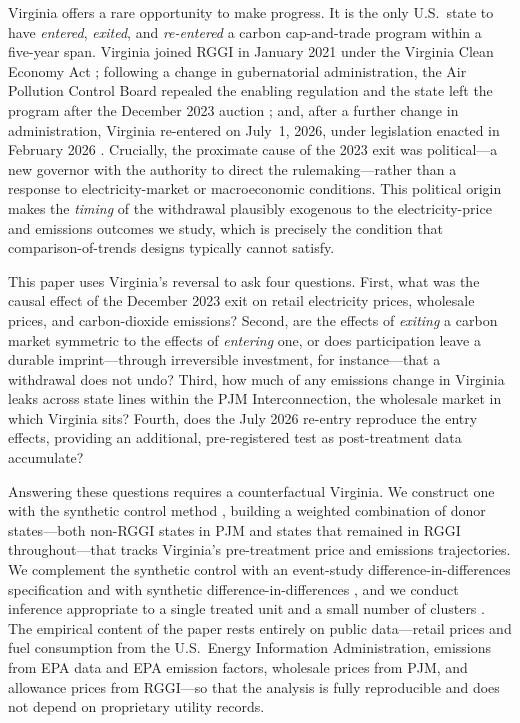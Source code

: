 \documentclass[12pt]{article}
\begin{document}
Virginia offers a rare opportunity to make progress. It is the only U.S.\ state to have
\emph{entered}, \emph{exited}, and \emph{re-entered} a carbon cap-and-trade
program within a five-year span. Virginia joined RGGI in January 2021 under the Virginia
Clean Economy Act \citep{VCEA2020}; following a change in gubernatorial administration, the
Air Pollution Control Board repealed the enabling regulation and the state left the program
after the December 2023 auction \citep{VAAPCB2023_repeal}; and, after a further change in
administration, Virginia re-entered on July~1, 2026, under legislation enacted in February
2026 \citep{VAHB29_2026,VADEQ2026_reinstate}. Crucially, the proximate
cause of the 2023 exit was political---a new governor with the authority to direct the
rulemaking---rather than a response to electricity-market or macroeconomic conditions. This
political origin makes the \emph{timing} of the withdrawal plausibly exogenous to the
electricity-price and emissions outcomes we study, which is precisely the condition that
comparison-of-trends designs typically cannot satisfy.

This paper uses Virginia's reversal to ask four questions. First, what was the causal effect
of the December 2023 exit on retail electricity prices, wholesale prices, and carbon-dioxide
emissions? Second, are the effects of \emph{exiting} a carbon market symmetric to the effects
of \emph{entering} one, or does participation leave a durable imprint---through irreversible
investment, for instance---that a withdrawal does not undo? Third, how much of any emissions
change in Virginia leaks across state lines within the PJM Interconnection, the wholesale
market in which Virginia sits? Fourth, does the July 2026 re-entry reproduce the entry
effects, providing an additional, pre-registered test as post-treatment data accumulate?

Answering these questions requires a counterfactual Virginia. We construct one with the
synthetic control method \citep{Abadie2010_synth,Abadie2015_comparative,Abadie2021_using_synth},
building a weighted combination of donor states---both non-RGGI states in PJM and states that
remained in RGGI throughout---that tracks Virginia's pre-treatment price and emissions
trajectories. We complement the synthetic control with an event-study
difference-in-differences specification and with synthetic difference-in-differences
\citep{Arkhangelsky2021_sdid}, and we conduct inference appropriate to a single treated unit
and a small number of clusters \citep{Cattaneo2021_prediction,Cameron2008_bootstrap}. The
empirical content of the paper rests entirely on public data---retail prices and fuel
consumption from the U.S.\ Energy Information Administration, emissions from EPA data and
EPA emission factors, wholesale prices from PJM, and allowance prices from RGGI---so that the
analysis is fully reproducible and does not depend on proprietary utility records.
\end{document}
